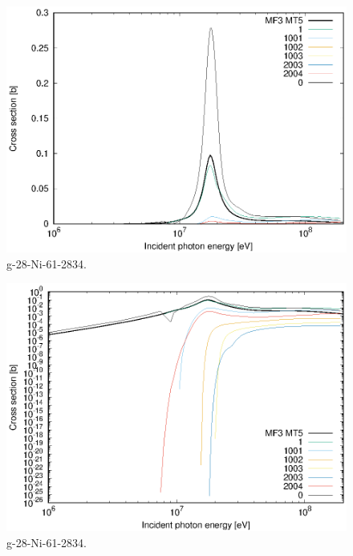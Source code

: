 \begin{figure}
 \includegraphics[width=\linewidth]{eps/g_28-Ni-61_2834.eps}
  \caption{g-28-Ni-61-2834.}
\end{figure}
\begin{figure}
 \includegraphics[width=\linewidth]{eps-log/g_28-Ni-61_2834.eps}
 \caption{g-28-Ni-61-2834.}
\end{figure}
\newpage \clearpage

